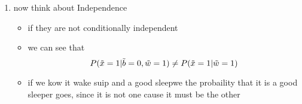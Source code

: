 \documentclass[12pt,twoside]{article}
\begin{document}
\begin{enumerate}
\begin{enumerate}
{\begin{enumerate}
\begin{itemize}
    \item $P(\Tilde{x}=1|\Tilde{b}=0,\Tilde{w}=1)$
    \item $=\frac{P(\Tilde{x}=1,\Tilde{b}=0,\Tilde{w}=1)}{P(\Tilde{b}=0,\Tilde{w}=1)}$
    \item =$\frac{P(\Tilde{w}=1|\Tilde{x}=1,\Tilde{b}=0)P(\Tilde{b}=0|\Tilde{x}=1)P(\Tilde{x}=1)}{P(\Tilde{b}=0,\Tilde{w}=1)}$
    \item =$\frac{P(\Tilde{w}=1|\Tilde{x}=1,\Tilde{b}=0)P(\Tilde{b}=0)P(\Tilde{x}=1)}{P(\Tilde{b}=0,\Tilde{w}=1)}$
    \item $=\frac{P(\Tilde{w}=1|\Tilde{x}=1,\Tilde{b}=0)P(\Tilde{b}=0)P(\Tilde{x}=1)}{\Sigma_{x=0}^{1} P(\Tilde{b}=0, \Tilde{x}=x,\Tilde{w}=1)}$
    \item $=\frac{P(\Tilde{w}=1|\Tilde{x}=1,\Tilde{b}=0)P(\Tilde{b}=0)P(\Tilde{x}=1)}{\Sigma_{x=0}^{1} P(\Tilde{w}=1|\Tilde{b}=0, \Tilde{x}=x)P(\Tilde{b}=0, \Tilde{x}=x)}$
    \item $\frac{P(\Tilde{w}=1|\Tilde{x}=1,\Tilde{b}=0)P(\Tilde{b}=0)P(\Tilde{x}=1)}{\Sigma_{x=0}^{1} P(\Tilde{w}=1|\Tilde{b}=0, \Tilde{x}=x)P(\Tilde{b}=0| \Tilde{x}=x)P(\Tilde{x}=x)}$
    \item $\frac{P(\Tilde{w}=1|\Tilde{x}=1,\Tilde{b}=0)P(\Tilde{b}=0)P(\Tilde{x}=1)}{\Sigma_{x=0}^{1} P(\Tilde{w}=1|\Tilde{b}=0, \Tilde{x}=x)P(\Tilde{b}=0)P(\Tilde{x}=x)}$
    \item 0.5025
\end{itemize}
\item now think about Independence
\begin{itemize}
    
\item if they are not conditionally independent 
\item we can see that $$P(\Tilde{x}=1|\Tilde{b}=0,\Tilde{w}=1)\neq P(\Tilde{x}=1|\Tilde{w}=1)$$

\item if we kow it wake suip and a good sleepwe the probaility that it is a good sleeper goes, since it is not one cause it must be the other
\end{itemize}


\end{enumerate}
}

\end{enumerate}
\newpage


\end{enumerate}
\end{document}
